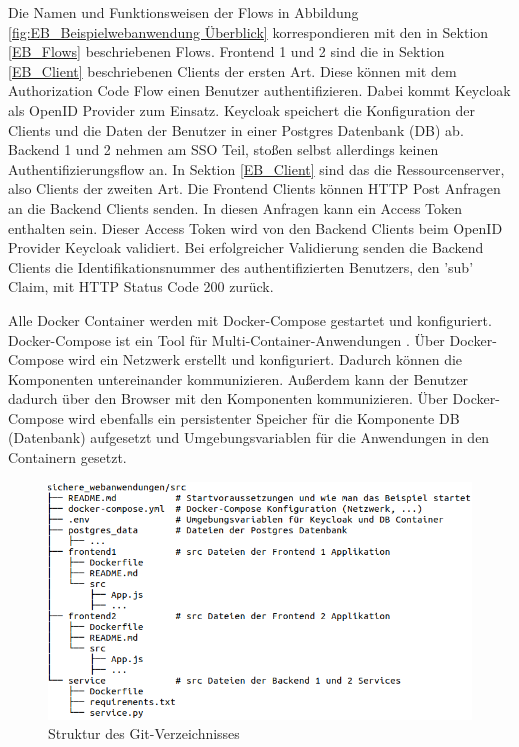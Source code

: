 Die Namen und Funktionsweisen der Flows in Abbildung \ref{fig:EB_Beispielwebanwendung Überblick} korrespondieren mit den in Sektion \ref{EB_Flows} beschriebenen Flows. Frontend 1 und 2 sind die in Sektion \ref{EB_Client} beschriebenen Clients der ersten Art. Diese können mit dem Authorization Code Flow einen Benutzer authentifizieren. Dabei kommt Keycloak als OpenID Provider zum Einsatz. Keycloak speichert die Konfiguration der Clients und die Daten der Benutzer in einer Postgres Datenbank (DB) ab. Backend 1 und 2 nehmen am SSO Teil, stoßen selbst allerdings keinen Authentifizierungsflow an. In Sektion \ref{EB_Client} sind das die Ressourcenserver, also Clients der zweiten Art. Die Frontend Clients können HTTP Post Anfragen an die Backend Clients senden. In diesen Anfragen kann ein Access Token enthalten sein. Dieser Access Token wird von den Backend Clients beim OpenID Provider Keycloak validiert. Bei erfolgreicher Validierung senden die Backend Clients die Identifikationsnummer des authentifizierten Benutzers, den 'sub' Claim, mit HTTP Status Code 200 zurück.

Alle Docker Container werden mit Docker-Compose gestartet und konfiguriert. Docker-Compose ist ein Tool für Multi-Container-Anwendungen \cite{EB40}. Über Docker-Compose wird ein Netzwerk erstellt und konfiguriert. Dadurch können die Komponenten untereinander kommunizieren. Außerdem kann der Benutzer dadurch über den Browser mit den Komponenten kommunizieren. Über Docker-Compose wird ebenfalls ein persistenter Speicher für die Komponente DB (Datenbank) aufgesetzt und Umgebungsvariablen für die Anwendungen in den Containern gesetzt.

\begin{figure}[!ht]
	\centering
	\includegraphics[width=1\textwidth]{Images/EbertScherer/srcDirectoryStructure.PNG}
	\caption{Struktur des Git-Verzeichnisses}
	\label{fig:EB_Struktur des Git-Verzeichnisses}
\end{figure}

